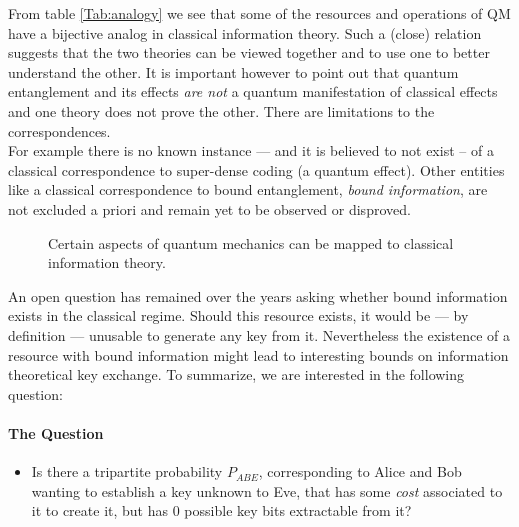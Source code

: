From table \ref{Tab:analogy} we see that some of the resources and operations of QM have a bijective analog in classical information theory. 
Such a (close) relation suggests that the two theories can be viewed together and to use one to better understand the other. 
It is important however to point out that quantum entanglement and its effects \emph{are not} a quantum manifestation of classical effects and one theory does not prove the other.
There are limitations to the correspondences. \\
For example there is no known instance --- and it is believed to not exist -- of a classical correspondence to super-dense coding (a quantum effect). Other entities like a classical correspondence to bound entanglement, \emph{bound information}, are not excluded a priori and remain yet to be observed or disproved.\\

	\begin{figure}[h!]
		\centering
		
		\caption{Certain aspects of quantum mechanics can be mapped to classical information theory.}
		\label{Fig:bigpicture}
	\end{figure}
An open question has remained over the years asking whether bound information exists in the classical regime.
Should this resource exists, it would be --- by definition --- unusable to generate any key from it.
Nevertheless the existence of a resource with bound information might lead to interesting bounds on information theoretical key exchange.
To summarize, we are interested in the following question:

\paragraph*{The Question}
\begin{itemize}
		\item[] Is there a tripartite probability $P_{ABE}$, corresponding to Alice and Bob wanting to establish a key unknown to Eve, that has some \emph{cost} associated to it to create it, but has $0$ possible key bits extractable from it? 
\end{itemize}


	